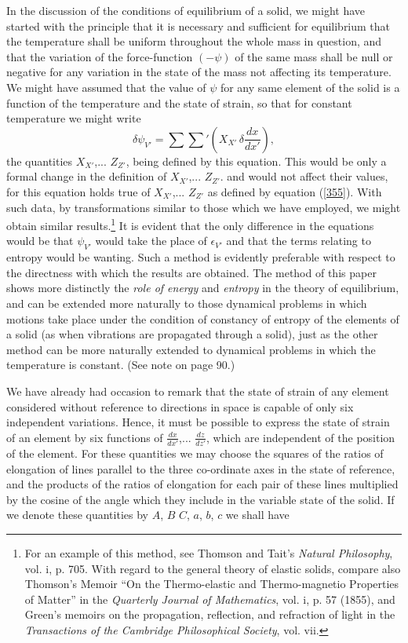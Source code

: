 \documentclass[12pt]{article}
\begin{document}
{In the discussion of the conditions of equilibrium of a solid, we might have started with the principle that it is necessary and sufficient for equilibrium that the temperature shall be uniform throughout the whole mass in question, and that the variation of the force-function $(-\psi)$ of the same mass shall be null or negative for any variation in the state of the mass not affecting its temperature.  We might have assumed that the value of $\psi$ for any same element of the solid is a function of the temperature and the state of strain, so that for constant temperature we might write
$$ \delta \psi_{V'} = \sum \sum\nolimits' \left( X_{X'}\,\delta \frac{dx}{dx'}\right) ,  $$
the quantities $X_{X'}$,... $Z_{Z'}$, being defined by this equation. This would be only a formal change in the definition of $X_{X'}$,... $Z_{Z'}$. and would not affect their values, for this equation holds true of $X_{X'}$,... $Z_{Z'}$ as defined by equation (\ref{355}). With such data, by transformations similar to those which we have employed, we might obtain similar results.\footnote{For an example of this method, see Thomson and Tait's \textit{Natural Philosophy}, vol. i, p. 705. With regard to the general theory of elastic solids, compare also Thomson's Memoir ``On the Thermo-elastic and Thermo-magnetio Properties of Matter'' in the \textit{Quarterly Journal of Mathematics}, vol. i, p. 57 (1855), and Green's memoirs on the propagation, reflection, and refraction of light in the \textit{Transactions of the Cambridge Philosophical Society}, vol. vii.} It is evident that the only difference in the equations would be that $\psi_{V'}$ would take the place of $\epsilon_{V'}$ and that the terms relating to entropy would be wanting. Such a method is evidently preferable with respect to the directness with which the results are obtained. The method of this paper shows more distinctly the \textit{role of energy} and \textit{entropy} in the theory of equilibrium, and can be extended more naturally to those dynamical problems in which motions take place under the condition of constancy of entropy of the elements of a solid (as when vibrations are propagated through a solid), just as the other method can be more naturally extended to dynamical problems in which the temperature is constant. (See note on page 90.)


We have already had occasion to remark that the state of strain of any element considered without reference to directions in space is capable of only six independent variations. Hence, it must be possible to express the state of strain of an element by six functions of $\frac{dx}{dx'}$,... $\frac{dz}{dz'}$, which are independent of the position of the element. For these quantities we may choose the squares of the ratios of elongation of lines parallel to the three co-ordinate axes in the state of reference, and the products of the ratios of elongation for each pair of these lines multiplied by the cosine of the angle which they include in the variable state of the solid. If we denote these quantities by $A$, $B$ $C$, $a$, $b$, $c$ we shall have



}
\end{document}
